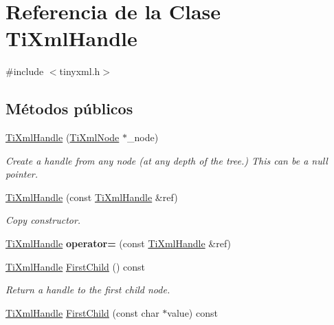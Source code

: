 \hypertarget{class_ti_xml_handle}{\section{Referencia de la Clase Ti\-Xml\-Handle}
\label{class_ti_xml_handle}
}


{\ttfamily \#include $<$tinyxml.\-h$>$}

\subsection*{Métodos públicos}
\begin{DoxyCompactItemize}
\item 
\hypertarget{class_ti_xml_handle_aba18fd7bdefb942ecdea4bf4b8e29ec8}{\hyperlink{class_ti_xml_handle_aba18fd7bdefb942ecdea4bf4b8e29ec8}{Ti\-Xml\-Handle} (\hyperlink{class_ti_xml_node}{Ti\-Xml\-Node} $\ast$\-\_\-node)}\label{class_ti_xml_handle_aba18fd7bdefb942ecdea4bf4b8e29ec8}

\begin{DoxyCompactList}\small\item\em Create a handle from any node (at any depth of the tree.) This can be a null pointer. \end{DoxyCompactList}\item 
\hypertarget{class_ti_xml_handle_a236d7855e1e56ccc7b980630c48c7fd7}{\hyperlink{class_ti_xml_handle_a236d7855e1e56ccc7b980630c48c7fd7}{Ti\-Xml\-Handle} (const \hyperlink{class_ti_xml_handle}{Ti\-Xml\-Handle} \&ref)}\label{class_ti_xml_handle_a236d7855e1e56ccc7b980630c48c7fd7}

\begin{DoxyCompactList}\small\item\em Copy constructor. \end{DoxyCompactList}\item 
\hypertarget{class_ti_xml_handle_ad8e5dcf6a87882674203157f29f8e4db}{\hyperlink{class_ti_xml_handle}{Ti\-Xml\-Handle} {\bfseries operator=} (const \hyperlink{class_ti_xml_handle}{Ti\-Xml\-Handle} \&ref)}\label{class_ti_xml_handle_ad8e5dcf6a87882674203157f29f8e4db}

\item 
\hypertarget{class_ti_xml_handle_acdb1faaf88a700b40ca2c8d9aee21139}{\hyperlink{class_ti_xml_handle}{Ti\-Xml\-Handle} \hyperlink{class_ti_xml_handle_acdb1faaf88a700b40ca2c8d9aee21139}{First\-Child} () const }\label{class_ti_xml_handle_acdb1faaf88a700b40ca2c8d9aee21139}

\begin{DoxyCompactList}\small\item\em Return a handle to the first child node. \end{DoxyCompactList}\item 
\hypertarget{class_ti_xml_handle_a8c61f64ae9365d89c264f289085541f8}{\hyperlink{class_ti_xml_handle}{Ti\-Xml\-Handle} \hyperlink{class_ti_xml_handle_a8c61f64ae9365d89c264f289085541f8}{First\-Child} (const char $\ast$value) const }\label{class_ti_xml_handle_a8c61f64ae9365d89c264f289085541f8}


\end{DoxyCompactItemize}
